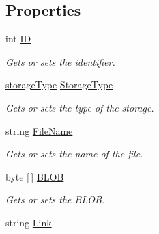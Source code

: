 \subsection*{Properties}
\begin{DoxyCompactItemize}
\item 
int \hyperlink{class_open_1_1_g_i_1_1hypermart_1_1_data_transformation_objects_1_1_file_d_t_o_ab187e7f070650067d055de8f707e1eed}{ID}
\begin{DoxyCompactList}\small\item\em Gets or sets the identifier. \end{DoxyCompactList}\item 
\hyperlink{namespace_open_1_1_g_i_1_1hypermart_1_1_models_a21c5ffa7da75ad8a6d2b04798113f9db}{storage\+Type} \hyperlink{class_open_1_1_g_i_1_1hypermart_1_1_data_transformation_objects_1_1_file_d_t_o_a4563713ee116eb1163eaac1f242b395f}{Storage\+Type}
\begin{DoxyCompactList}\small\item\em Gets or sets the type of the storage. \end{DoxyCompactList}\item 
string \hyperlink{class_open_1_1_g_i_1_1hypermart_1_1_data_transformation_objects_1_1_file_d_t_o_a55fb34aacab9513037108ff3f1d287a8}{File\+Name}
\begin{DoxyCompactList}\small\item\em Gets or sets the name of the file. \end{DoxyCompactList}\item 
byte \mbox{[}$\,$\mbox{]} \hyperlink{class_open_1_1_g_i_1_1hypermart_1_1_data_transformation_objects_1_1_file_d_t_o_af2ebb686a878cb8342e76648d048f19a}{B\+L\+OB}
\begin{DoxyCompactList}\small\item\em Gets or sets the B\+L\+OB. \end{DoxyCompactList}\item 
string \hyperlink{class_open_1_1_g_i_1_1hypermart_1_1_data_transformation_objects_1_1_file_d_t_o_af58091e5ba2e9fde7db92f08dc4d3a41}{Link}

\end{DoxyCompactItemize}

